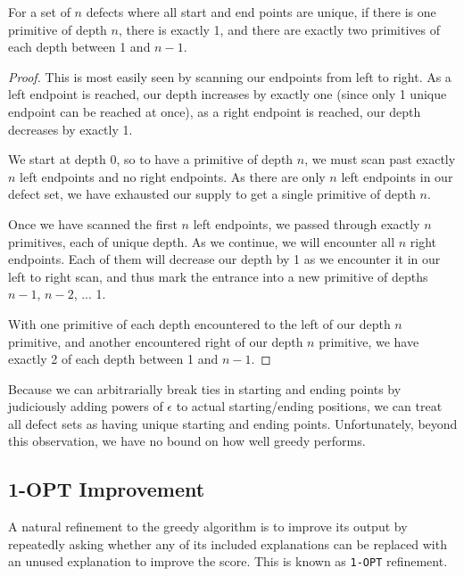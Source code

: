 \documentclass[11pt,twocolumn]{article}
\begin{document}
\begin{lem} \label{lemma: Number of primitives}
For a set of $n$ defects where all start and end points are unique, if there is one primitive of depth $n$, there is exactly 1, and there are exactly two primitives of each depth between 1 and $n-1$.
\end{lem}

\begin{proof}
This is most easily seen by scanning our endpoints from left to right.  As a left endpoint is reached, our depth increases by exactly one (since only 1 unique endpoint can be reached at once), as a right endpoint is reached, our depth decreases by exactly 1.

We start at depth 0, so to have a primitive of depth $n$, we must scan past exactly $n$ left endpoints and no right endpoints.  As there are only $n$ left endpoints in our defect set, we have exhausted our supply to get a single primitive of depth $n$.

Once we have scanned the first $n$ left endpoints, we passed through exactly $n$ primitives, each of unique depth.  As we continue, we will encounter all $n$ right endpoints.  Each of them will decrease our depth by 1 as we encounter it in our left to right scan, and thus mark the entrance into a new primitive of depths $n-1$, $n-2$, ... 1.  

With one primitive of each depth encountered to the left of our depth $n$ primitive, and another encountered right of our depth $n$ primitive, we have exactly 2 of each depth between 1 and $n-1$.
\end{proof}

Because we can arbitrarially break ties in starting and ending points by judiciously adding powers of $\epsilon$ to actual starting/ending positions, we can treat all defect sets as having unique starting and ending points.  Unfortunately, beyond this observation, we have no bound on how well greedy performs.

\subsection{1-OPT Improvement}

A natural refinement to the greedy algorithm is to improve its output by repeatedly asking whether any of its included explanations can be replaced with an unused explanation to improve the score.  This is known as \texttt{1-OPT} refinement.  
\end{document}
